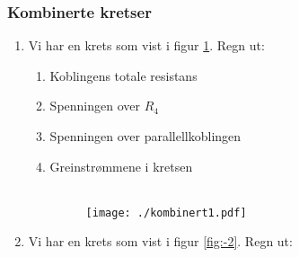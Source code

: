 \documentclass[12pt,a4paper]{article}
\begin{document}
\subsubsection{Kombinerte kretser}
\begin{enumerate}
\item Vi har en krets som vist i figur \ref{fig:-22}. Regn ut:\\

\begin{enumerate}
\item Koblingens totale resistans
\\
\item Spenningen over $R_{4}$
\\
\item Spenningen over parallellkoblingen
\\
\item Greinstrømmene i kretsen\\
\\
\begin{figure}[H]
\noindent \begin{centering}
\texttt{[image: ./kombinert1.pdf]}
\par\end{centering}
\caption{\label{fig:-22}}
\end{figure}
\end{enumerate}
\item Vi har en krets som vist i figur \ref{fig:-2}. Regn ut:


\end{enumerate}
\end{document}
